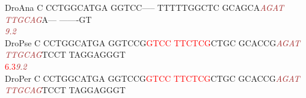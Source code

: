 \documentclass[11pt,twoside,reqno,a4paper]{article}
\begin{document}
{DroAna	C	CCTGGCATGA	GGTCC-----	TTTTTGGCTC	GCAGCA\textit{\textcolor{Brown}{A}}\textit{\textcolor{Brown}{G}}\textit{\textcolor{Brown}{A}}\textit{\textcolor{Brown}{T}}	\textit{\textcolor{Brown}{T}}\textit{\textcolor{Brown}{T}}\textit{\textcolor{Brown}{G}}\textit{\textcolor{Brown}{C}}\textit{\textcolor{Brown}{A}}\textit{\textcolor{Brown}{G}}A---	-------GT\\
\hspace*{7\charwidth}\hspace*{1\charwidth}\hspace*{1\charwidth}\hspace*{1\charwidth}\hspace*{1\charwidth}\hspace*{37\charwidth}\textit{\textcolor{Brown}{9.2}}\hspace*{1\charwidth}\hspace*{1\charwidth}\\
DroPse	C	CCTGGCATGA	GGTCCG\textcolor{Red}{G}\textcolor{Red}{T}\textcolor{Red}{C}\textcolor{Red}{C}	\textcolor{Red}{T}\textcolor{Red}{T}\textcolor{Red}{C}\textcolor{Red}{T}\textcolor{Red}{C}\textcolor{Red}{G}CTGC	GCACCG\textit{\textcolor{Brown}{A}}\textit{\textcolor{Brown}{G}}\textit{\textcolor{Brown}{A}}\textit{\textcolor{Brown}{T}}	\textit{\textcolor{Brown}{T}}\textit{\textcolor{Brown}{T}}\textit{\textcolor{Brown}{G}}\textit{\textcolor{Brown}{C}}\textit{\textcolor{Brown}{A}}\textit{\textcolor{Brown}{G}}TCCT	TAGGAGGGT\\
\hspace*{7\charwidth}\hspace*{1\charwidth}\hspace*{1\charwidth}\hspace*{17\charwidth}\textcolor{Red}{6.3}\hspace*{1\charwidth}\hspace*{1\charwidth}\hspace*{17\charwidth}\textit{\textcolor{Brown}{9.2}}\hspace*{1\charwidth}\hspace*{1\charwidth}\\
DroPer	C	CCTGGCATGA	GGTCCG\textcolor{Red}{G}\textcolor{Red}{T}\textcolor{Red}{C}\textcolor{Red}{C}	\textcolor{Red}{T}\textcolor{Red}{T}\textcolor{Red}{C}\textcolor{Red}{T}\textcolor{Red}{C}\textcolor{Red}{G}CTGC	GCACCG\textit{\textcolor{Brown}{A}}\textit{\textcolor{Brown}{G}}\textit{\textcolor{Brown}{A}}\textit{\textcolor{Brown}{T}}	\textit{\textcolor{Brown}{T}}\textit{\textcolor{Brown}{T}}\textit{\textcolor{Brown}{G}}\textit{\textcolor{Brown}{C}}\textit{\textcolor{Brown}{A}}\textit{\textcolor{Brown}{G}}TCCT	TAGGAGGGT\\
}
\end{document}
